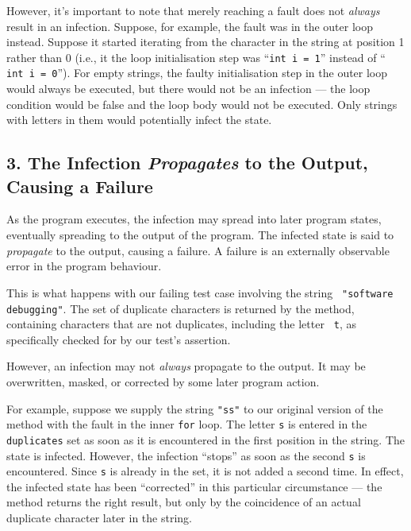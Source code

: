 However, it's important to note that merely reaching a fault does not {\it
always} result in an infection. 
%
Suppose, for example, the fault was in the outer loop instead. Suppose it
started iterating from the character in the string at position 1 rather than 0
(i.e., it the loop initialisation step was ``{\tt int i = 1}'' instead of ``{\tt
int i = 0}''). For empty strings, the faulty initialisation step in the outer
loop would always be executed, but there would not be an infection --- the loop
condition would be false and the loop body would not be executed. Only strings
with letters in them would potentially infect the state.


\subsection*{3. The Infection {\it Propagates} to the Output, Causing a Failure}


As the program executes, the infection may spread into later program states,
eventually spreading to the output of the program. The infected state is said to
{\it propagate} to the output, causing a failure. A failure is an externally
observable error in the program behaviour.

This is what happens with our failing test case involving the string {\tt
"software debugging"}. The set of duplicate characters is returned by the
method, containing characters that are not duplicates, including the letter {\tt
t}, as specifically checked for by our test's assertion.

However, an infection may not {\it always} propagate to the output. It may be
overwritten, masked, or corrected by some later program action.

For example, suppose we supply the string {\tt "ss"} to our original version of
the method with the fault in the inner {\tt for} loop. The letter {\tt s} is
entered in the {\tt duplicates} set as soon as it is encountered in the first
position in the string. The state is infected. However, the infection ``stops''
as soon as the second {\tt s} is encountered. Since {\tt s} is already in the
set, it is not added a second time. In effect, the infected state has been
``corrected'' in this particular circumstance --- the method returns the right
result, but only by the coincidence of an actual duplicate character later in
the string.

